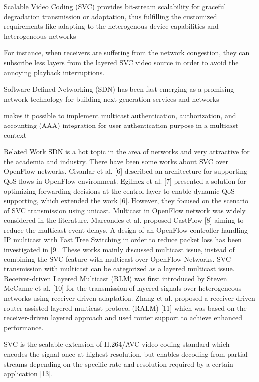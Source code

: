\documentclass[a4paper, 10pt, conference]{ieeeconf}
\begin{document}
Scalable Video Coding (SVC) \cite{schwarz2007overview} provides bit-stream scalability for graceful degradation transmission or adaptation, thus fulfilling the customized requirements like adapting to the heterogenous device capabilities and heterogeneous networks

For instance, when receivers are suffering from the network congestion, they can subscribe less layers from the layered SVC video source in order to avoid the annoying playback interruptions. 

Software-Defined Networking (SDN) \cite{sezer2013we} has been fast emerging as a promising network technology for building next-generation services and networks \cite{yang2014multicast}

makes it possible to implement multicast authentication, authorization, and accounting (AAA) integration for user authentication purpose in a multicast context

Related Work
SDN is a hot topic in the area of networks and very
attractive for the academia and industry. There have been
some works about SVC over OpenFlow networks. Civanlar et
al. [6] described an architecture for supporting QoS flows in
OpenFlow environment. Egilmez et al. [7] presented a solution
for optimizing forwarding decisions at the control layer to
enable dynamic QoS supporting, which extended the work [6].
However, they focused on the scenario of SVC transmission
using unicast. Multicast in OpenFlow network was widely considered
in the literature. Marcondes et al. proposed CastFlow
[8] aiming to reduce the multicast event delays. A design of
an OpenFlow controller handling IP multicast with Fast Tree
Switching in order to reduce packet loss has been investigated
in [9]. These works mainly discussed multicast issue, instead
of combining the SVC feature with multicast over OpenFlow
Networks.
SVC transmission with multicast can be categorized as
a layered multicast issue. Receiver-driven Layered Multicast
(RLM) was first introduced by Steven McCanne et al. [10]
for the transmission of layered signals over heterogeneous
networks using receiver-driven adaptation. Zhang et al. proposed
a receiver-driven router-assisted layered multicast protocol
(RALM) [11] which was based on the receiver-driven
layered approach and used router support to achieve enhanced
performance.

SVC is the scalable extension of H.264/AVC video coding
standard which encodes the signal once at highest resolution,
but enables decoding from partial streams depending on the
specific rate and resolution required by a certain application
[13].
\end{document}
